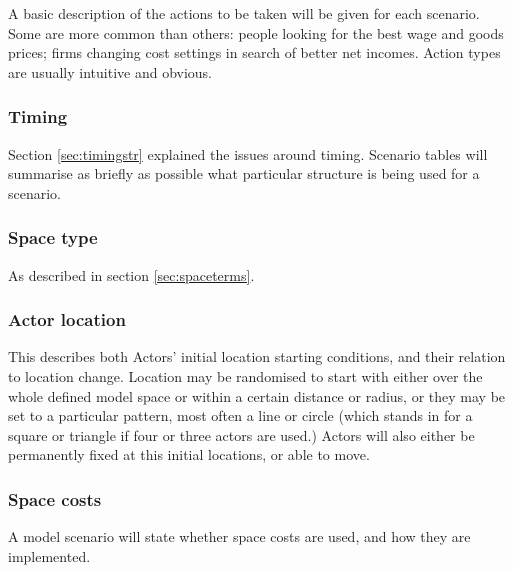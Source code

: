 A basic description of the actions to be taken will be given for each scenario. Some are more common than others: people looking for the best wage and goods prices; firms changing cost settings in search of better net incomes. Action types are usually intuitive and obvious. 

\subsubsection{Timing}

Section \ref{sec:timingstr} explained the issues around timing. Scenario tables will summarise as briefly as possible what particular structure is being used for a scenario. 

\subsubsection{Space type}

As described in section \ref{sec:spaceterms}.

\subsubsection{Actor location}

This describes both Actors' initial location starting conditions, and their relation to location change. Location may be randomised to start with either over the whole defined model space or within a certain distance or radius, or they may be set to a particular pattern, most often a line or circle (which stands in for a square or triangle if four or three actors are used.) Actors will also either be permanently fixed at this initial locations, or able to move. 

\subsubsection{Space costs}

A model scenario will state whether space costs are used, and how they are implemented. 

